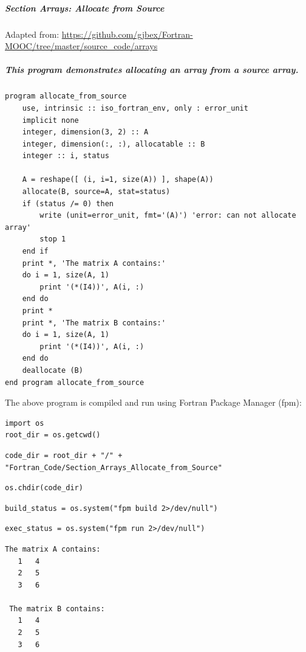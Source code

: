 \subparagraph{Section Arrays: Allocate from Source}

Adapted from: \href{https://github.com/gjbex/Fortran-MOOC/tree/master/source\_code/arrays}{https://github.com/gjbex/Fortran-MOOC/tree/master/source\_code/arrays}

\subparagraph{This program demonstrates allocating an array from a source array.}

\begin{verbatim}
program allocate_from_source
    use, intrinsic :: iso_fortran_env, only : error_unit
    implicit none
    integer, dimension(3, 2) :: A
    integer, dimension(:, :), allocatable :: B
    integer :: i, status

    A = reshape([ (i, i=1, size(A)) ], shape(A))
    allocate(B, source=A, stat=status)
    if (status /= 0) then
        write (unit=error_unit, fmt='(A)') 'error: can not allocate array'
        stop 1
    end if
    print *, 'The matrix A contains:'
    do i = 1, size(A, 1)
        print '(*(I4))', A(i, :)
    end do
    print *
    print *, 'The matrix B contains:'
    do i = 1, size(A, 1)
        print '(*(I4))', A(i, :)
    end do
    deallocate (B)
end program allocate_from_source
\end{verbatim}

The above program is compiled and run using Fortran Package Manager (fpm):

\begin{verbatim}
import os
root_dir = os.getcwd()
\end{verbatim}

\begin{verbatim}
code_dir = root_dir + "/" + "Fortran_Code/Section_Arrays_Allocate_from_Source"
\end{verbatim}

\begin{verbatim}
os.chdir(code_dir)
\end{verbatim}

\begin{verbatim}
build_status = os.system("fpm build 2>/dev/null")
\end{verbatim}

\begin{verbatim}
exec_status = os.system("fpm run 2>/dev/null")
\end{verbatim}

\begin{verbatim}
The matrix A contains:
   1   4
   2   5
   3   6

 The matrix B contains:
   1   4
   2   5
   3   6
\end{verbatim}